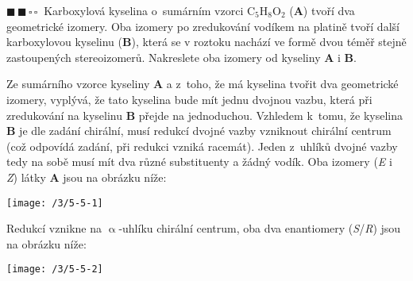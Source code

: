 \documentclass{book}
\newcommand{\dva}{$\blacksquare \, \blacksquare \, \square \, \square \; \; $}
\renewenvironment{quotation}{\par}{\par} %
\begin{document}
\hrulefill %
\begin{quotation}
\dva Karboxylová kyselina o~sumárním vzorci C$_{5}$H$_{8}$O$_{2}$ (\textbf{A})
tvoří dva geometrické izomery. Oba izomery po zredukování vodíkem
na platině tvoří další karboxylovou kyselinu (\textbf{B}), která se
v roztoku nachází ve formě dvou téměř stejně zastoupených stereoizomerů.
Nakreslete oba izomery od kyseliny \textbf{A} i \textbf{B}.
\end{quotation} \dotfill \par 
Ze sumárního vzorce kyseliny \textbf{A} a z~toho, že má kyselina tvořit
dva geometrické izomery, vyplývá, že tato kyselina bude mít jednu
dvojnou vazbu, která při zredukování na kyselinu \textbf{B} přejde
na jednoduchou. Vzhledem k~tomu, že kyselina \textbf{B} je dle zadání
chirální, musí redukcí dvojné vazby vzniknout chirální centrum (což
odpovídá zadání, při redukci vzniká racemát). Jeden z~uhlíků dvojné
vazby tedy na sobě musí mít dva různé substituenty a žádný vodík.
Oba izomery (\textit{E} i \textit{Z}) látky \textbf{A} jsou na obrázku níže:
\noindent \begin{center}

\texttt{[image: /3/5-5-1]}

\par\end{center}

Redukcí vznikne na $\upalpha$-uhlíku chirální centrum, oba dva enantiomery
(\textit{S}/\textit{R}) jsou na obrázku níže:
\noindent \begin{center}

\texttt{[image: /3/5-5-2]}

\par\end{center}
\end{document}
